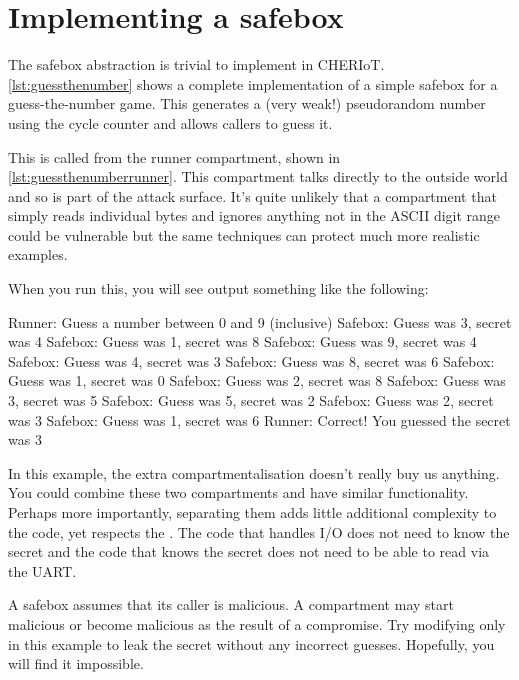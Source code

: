 \section{Implementing a safebox}

The safebox abstraction is trivial to implement in CHERIoT.
\ref{lst:guessthenumber} shows a complete implementation of a simple safebox for a guess-the-number game.
This generates a (very weak!) pseudorandom number using the cycle counter and allows callers to guess it.

\codelisting[marker=safebox,caption=A safebox for a guess-the-numbers game,label=lst:guessthenumber, filename=examples/safebox/safebox.cc]{}

This is called from the runner compartment, shown in \ref{lst:guessthenumberrunner}.
This compartment talks directly to the outside world and so is part of the attack surface.
It's quite unlikely that a compartment that simply reads individual bytes and ignores anything not in the ASCII digit range could be vulnerable but the same techniques can protect much more realistic examples.

\codelisting[marker=runner,caption=The runner compartment for the guess-the-numbers game,label=lst:guessthenumberrunner, filename=examples/safebox/runner.cc]{}

When you run this, you will see output something like the following:

\begin{console}
Runner: Guess a number between 0 and 9 (inclusive)
Safebox: Guess was 3, secret was 4
Safebox: Guess was 1, secret was 8
Safebox: Guess was 9, secret was 4
Safebox: Guess was 4, secret was 3
Safebox: Guess was 8, secret was 6
Safebox: Guess was 1, secret was 0
Safebox: Guess was 2, secret was 8
Safebox: Guess was 3, secret was 5
Safebox: Guess was 5, secret was 2
Safebox: Guess was 2, secret was 3
Safebox: Guess was 1, secret was 6
Runner: Correct!  You guessed the secret was 3
\end{console}

In this example, the extra compartmentalisation doesn't really buy us anything.
You could combine these two compartments and have similar functionality.
Perhaps more importantly, separating them adds little additional complexity to the code, yet respects the .
The code that handles I/O does not need to know the secret and the code that knows the secret does not need to be able to read via the UART.

A safebox assumes that its caller is malicious.
A compartment may start malicious or become malicious as the result of a compromise.
Try modifying only  in this example to leak the secret without any incorrect guesses.
Hopefully, you will find it impossible.

